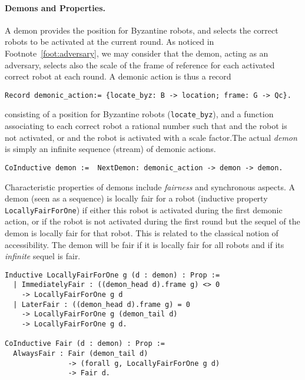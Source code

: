 \documentclass[11pt,a4]{llncs}
\begin{document}
\paragraph*{Demons and Properties.}\label{sec:formal-demons}
  A demon provides the position for Byzantine robots, and selects the
  correct robots to be activated at the current round. As noticed in
  Footnote~\ref{foot:adversary}, we may consider that the demon,
  acting as an adversary, selects also the scale of the frame of
  reference for each activated
  correct robot at each round. A demonic action is thus a record 
\begin{lstlisting}
Record demonic_action:= {locate_byz: B -> location; frame: G -> Qc}.
\end{lstlisting}
consisting of a position for Byzantine robots
(\lstinline!locate_byz!), and a function associating to each correct
robot a rational number  such that  and the robot is not
activated, or  and the robot is activated with a scale
factor.The actual \emph{demon} is simply an infinite sequence (stream) of
demonic actions.
\begin{lstlisting}
CoInductive demon :=  NextDemon: demonic_action -> demon -> demon.
\end{lstlisting}

Characteristic properties of demons include \emph{fairness} and
synchronous aspects.
A demon (seen as a sequence) is locally fair for a robot (inductive property
\lstinline!LocallyFairForOne!) if either this robot is activated
during the first demonic action, or if the robot is not activated
during the first round but the sequel of the demon is locally fair for
that robot. This is related to the classical notion of accessibility.
The demon will be fair if it is locally fair for all robots and if its
\emph{infinite} sequel is fair. 

\begin{lstlisting}
Inductive LocallyFairForOne g (d : demon) : Prop :=
  | ImmediatelyFair : ((demon_head d).frame g) <> 0 
    -> LocallyFairForOne g d
  | LaterFair : ((demon_head d).frame g) = 0  
    -> LocallyFairForOne g (demon_tail d)
    -> LocallyFairForOne g d.

CoInductive Fair (d : demon) : Prop :=
  AlwaysFair : Fair (demon_tail d) 
               -> (forall g, LocallyFairForOne g d) 
               -> Fair d.
\end{lstlisting}
\end{document}
